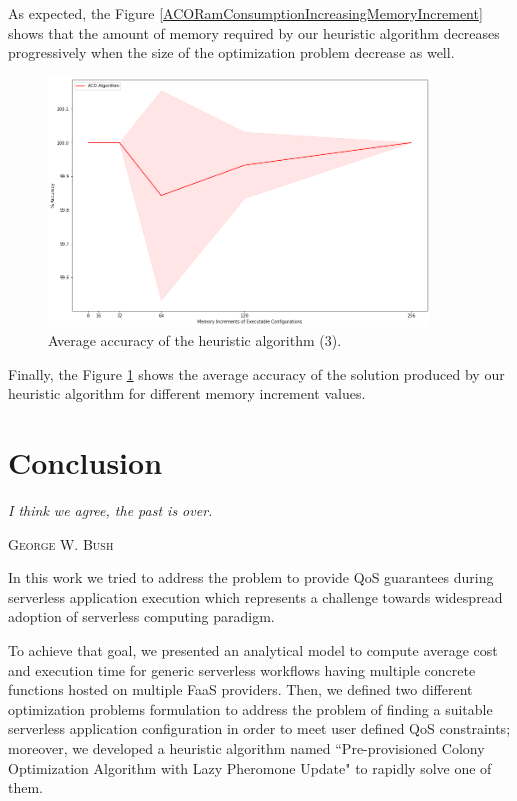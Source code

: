 \documentclass[12pt,a4paper]{report}
\newcommand{\QuoteIntro}{``}
\begin{document}
As expected, the Figure \ref{ACORamConsumptionIncreasingMemoryIncrement} shows that the amount of memory required by our heuristic algorithm decreases progressively when the size of the optimization problem decrease as well.

\begin{figure}[h]
	\centering
	\includegraphics[width=0.9\textwidth]{./experiments/ACOvsOptimalAccuracyIncreasingMemoryIncrement.png}
	\caption{Average accuracy of the heuristic algorithm (3).}%
	\label{ACOvsOptimalAccuracyIncreasingMemoryIncrement}
\end{figure}

Finally, the Figure \ref{ACOvsOptimalAccuracyIncreasingMemoryIncrement} shows the average accuracy of the solution produced by our heuristic algorithm for different memory increment values.

\chapter{Conclusion}\label{chapterConclusion}
\epigraph{\itshape I think we agree, the past is over.}{\textsc{George W. Bush}}

In this work we tried to address the problem to provide QoS guarantees during serverless application execution which represents a challenge towards widespread adoption of serverless computing paradigm.

To achieve that goal, we presented an analytical model to compute average cost and execution time for generic serverless workflows having multiple concrete functions hosted on multiple FaaS providers. Then, we defined two different optimization problems formulation to address the problem of finding a suitable serverless application configuration in order to meet user defined QoS constraints; moreover, we developed a heuristic algorithm named \QuoteIntro Pre-provisioned Colony Optimization Algorithm with Lazy Pheromone Update" to rapidly solve one of them. 
\end{document}
